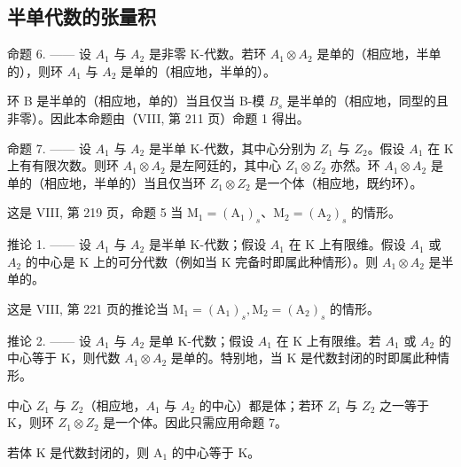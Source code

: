 \subsection{半单代数的张量积}

命题 6. —— 设 \(A_{1}\) 与 \(A_{2}\) 是非零 K-代数。若环 \(A_{1} \otimes A_{2}\) 是单的（相应地，半单的），则环 \(A_{1}\) 与 \(A_{2}\) 是单的（相应地，半单的）。

环 B 是半单的（相应地，单的）当且仅当 B-模 \(B_{s}\) 是半单的（相应地，同型的且非零）。因此本命题由（VIII, 第 211 页）命题 1 得出。

命题 7. —— 设 \(A_{1}\) 与 \(A_{2}\) 是半单 K-代数，其中心分别为 \(Z_{1}\) 与 \(Z_{2}\)。假设 \(A_{1}\) 在 K 上有有限次数。则环 \(A_{1} \otimes A_{2}\) 是左阿廷的，其中心 \(Z_{1} \otimes Z_{2}\) 亦然。环 \(A_{1} \otimes A_{2}\) 是单的（相应地，半单的）当且仅当环 \(Z_{1} \otimes Z_{2}\) 是一个体（相应地，既约环）。

这是 VIII, 第 219 页，命题 5 当 \(\mathrm{M}_1 = (\mathrm{A}_1)_s\)、\(\mathrm{M}_2 = (\mathrm{A}_2)_s\) 的情形。

推论 1. —— 设 \(A_{1}\) 与 \(A_{2}\) 是半单 K-代数；假设 \(A_{1}\) 在 K 上有限维。假设 \(A_{1}\) 或 \(A_{2}\) 的中心是 K 上的可分代数（例如当 K 完备时即属此种情形）。则 \(A_{1} \otimes A_{2}\) 是半单的。

这是 VIII, 第 221 页的推论当 \(\mathrm{M}_{1}=(\mathrm{A}_{1})_{s},\mathrm{M}_{2}=(\mathrm{A}_{2})_{s}\) 的情形。

推论 2. —— 设 \(A_{1}\) 与 \(A_{2}\) 是单 K-代数；假设 \(A_{1}\) 在 K 上有限维。若 \(A_{1}\) 或 \(A_{2}\) 的中心等于 K，则代数 \(A_{1} \otimes A_{2}\) 是单的。特别地，当 K 是代数封闭的时即属此种情形。

中心 \(Z_{1}\) 与 \(Z_{2}\)（相应地，\(A_{1}\) 与 \(A_{2}\) 的中心）都是体；若环 \(Z_{1}\) 与 \(Z_{2}\) 之一等于 K，则环 \(Z_{1} \otimes Z_{2}\) 是一个体。因此只需应用命题 7。

若体 \(\mathrm{K}\) 是代数封闭的，则 \(\mathrm{A}_1\) 的中心等于 \(\mathrm{K}\)。
